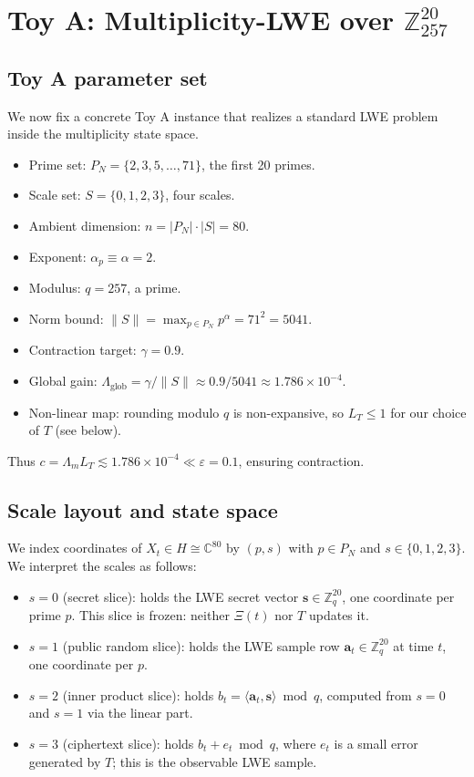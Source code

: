 \documentclass[11pt]{article}
\begin{document}
\section{Toy A: Multiplicity-LWE over $\mathbb{Z}_{257}^{20}$}

\subsection{Toy A parameter set}

We now fix a concrete Toy A instance that realizes a standard LWE problem
inside the multiplicity state space.

\begin{itemize}
    \item Prime set: $P_N = \{2,3,5,\dots,71\}$, the first 20 primes.
    \item Scale set: $S = \{0,1,2,3\}$, four scales.
    \item Ambient dimension: $n = |P_N| \cdot |S| = 80$.
    \item Exponent: $\alpha_p \equiv \alpha = 2$.
    \item Modulus: $q = 257$, a prime.
    \item Norm bound: $\|S\| = \max_{p \in P_N} p^{\alpha} = 71^2 = 5041$.
    \item Contraction target: $\gamma = 0.9$.
    \item Global gain: $\Lambda_{\mathrm{glob}} = \gamma / \|S\|
    \approx 0.9 / 5041 \approx 1.786 \times 10^{-4}$.
    \item Non-linear map: rounding modulo $q$ is non-expansive, so
    $L_T \le 1$ for our choice of $T$ (see below).
\end{itemize}

Thus $c = \Lambda_m L_T \lesssim 1.786 \times 10^{-4} \ll \varepsilon = 0.1$,
ensuring contraction.

\subsection{Scale layout and state space}

We index coordinates of $X_t \in H \cong \mathbb{C}^{80}$ by $(p,s)$ with
$p \in P_N$ and $s \in \{0,1,2,3\}$. We interpret the scales as follows:

\begin{itemize}
    \item $s=0$ (secret slice): holds the LWE secret vector
    $\mathbf{s} \in \mathbb{Z}_q^{20}$, one coordinate per prime $p$.
    This slice is frozen: neither $\Xi(t)$ nor $T$ updates it.
    \item $s=1$ (public random slice): holds the LWE sample row
    $\mathbf{a}_t \in \mathbb{Z}_q^{20}$ at time $t$, one coordinate per $p$.
    \item $s=2$ (inner product slice): holds
    $b_t = \langle \mathbf{a}_t, \mathbf{s} \rangle \bmod q$, computed
    from $s=0$ and $s=1$ via the linear part.
    \item $s=3$ (ciphertext slice): holds
    $b_t + e_t \bmod q$, where $e_t$ is a small error generated by $T$;
    this is the observable LWE sample.
\end{itemize}
\end{document}
